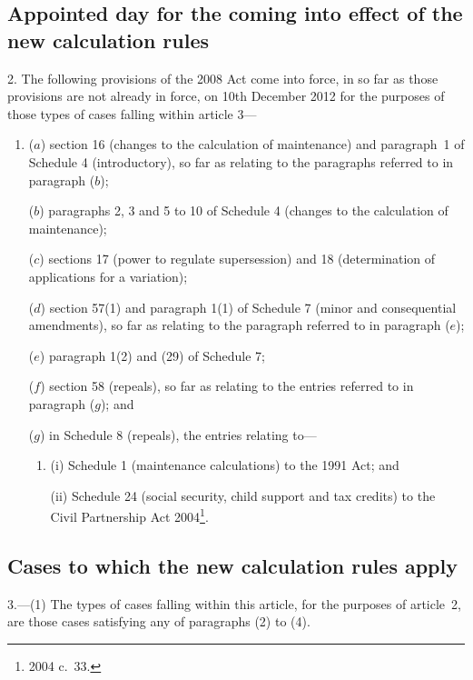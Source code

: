\documentclass[12pt,a4paper]{article}
\begin{document}
\subsection[2. Appointed day for the coming into effect of the new calculation rules]{Appointed day for the coming into effect of the new calculation rules}

2.  The following provisions of the 2008 Act come into force, in so far as those provisions are not already in force, on 10th December 2012 for the purposes of those types of cases falling within article 3—
\begin{enumerate}\item[]
($a$) section 16 (changes to the calculation of maintenance) and paragraph~1 of Schedule 4 (introductory), so far as relating to the paragraphs referred to in paragraph ($b$);

($b$) paragraphs 2, 3 and 5 to 10 of Schedule 4 (changes to the calculation of maintenance);

($c$) sections 17 (power to regulate supersession) and 18 (determination of applications for a variation);

($d$) section 57(1) and paragraph 1(1) of Schedule 7 (minor and consequential amendments), so far as relating to the paragraph referred to in paragraph ($e$);

($e$) paragraph 1(2) and (29) of Schedule 7;

($f$) section 58 (repeals), so far as relating to the entries referred to in paragraph ($g$); and

($g$) in Schedule 8 (repeals), the entries relating to—
\begin{enumerate}\item[]
(i) Schedule 1 (maintenance calculations) to the 1991 Act; and

(ii) Schedule 24 (social security, child support and tax credits) to the Civil Partnership Act 2004\footnote{2004 c.~33.}.
\end{enumerate}
\end{enumerate}

\subsection[3. Cases to which the new calculation rules apply]{Cases to which the new calculation rules apply}

3.---(1)  The types of cases falling within this article, for the purposes of article~2, are those cases satisfying any of paragraphs (2) to (4).
\end{document}
